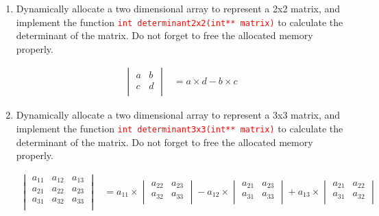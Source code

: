 \documentclass[12pt]{article}
\begin{document}
\begin{enumerate}
 
    \item Dynamically allocate a two dimensional array to represent a 2x2 matrix, and implement the function 
    \textcolor{red}{\texttt{int determinant2x2(int** matrix)}} to calculate the determinant of the matrix. Do not 
    forget to free the allocated memory properly.

    \begin{align*}
        \begin{vmatrix}
            a & b \\
            c & d \\
        \end{vmatrix} &= a \times d - b \times c
    \end{align*}

    \item Dynamically allocate a two dimensional array to represent a 3x3 matrix, and implement the function 
    \textcolor{red}{\texttt{int determinant3x3(int** matrix)}} to calculate the determinant of the matrix. Do not 
    forget to free the allocated memory properly.

    \begin{align*}
        \begin{vmatrix}
            a_{11} & a_{12} & a_{13} \\
            a_{21} & a_{22} & a_{23} \\
            a_{31} & a_{32} & a_{33} \\
        \end{vmatrix} &= a_{11} \times 
            \begin{vmatrix}
                a_{22} & a_{23} \\  
                a_{32} & a_{33} \\  
            \end{vmatrix} - a_{12} \times 
            \begin{vmatrix}
                a_{21} & a_{23} \\  
                a_{31} & a_{33} \\ 
            \end{vmatrix} + a_{13} \times 
            \begin{vmatrix}
                a_{21} & a_{22} \\  
                a_{31} & a_{32} \\
            \end{vmatrix}
    \end{align*}




\end{enumerate}
\end{document}
